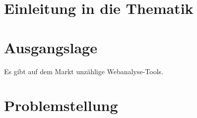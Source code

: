 \section{Einleitung in die Thematik}

\section{Ausgangslage}
Es gibt auf dem Markt unzählige Webanalyse-Tools. 

\section{Problemstellung}

